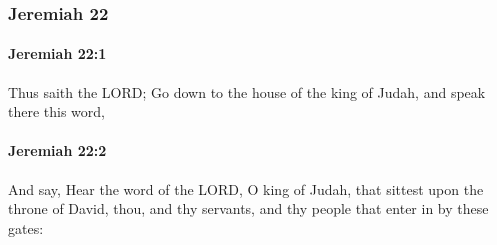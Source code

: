 	\subsubsection{Jeremiah 22} %
		\label{JEREMIAH-22}

		\paragraph{Jeremiah 22:1} %
			\label{JEREMIAH-22-1}

			Thus saith the LORD; Go down to the house of the king of Judah, and speak there this word,


		\paragraph{Jeremiah 22:2} %
			\label{JEREMIAH-22-2}

			And say, Hear the word of the LORD, O king of Judah, that sittest upon the throne of David, thou, and thy servants, and thy people that enter in by these gates:


